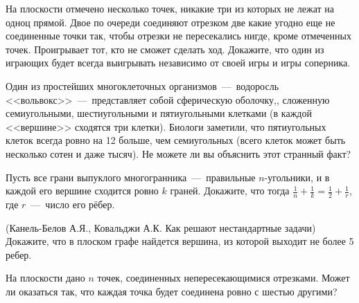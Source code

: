 \begin{exersize}
	На плоскости отмечено несколько точек, никакие три из которых не лежат на одноц прямой. Двое по очереди соединяют отрезком две какие угодно еще не соединенные точки так, чтобы отрезки не пересекались нигде, кроме отмеченных точек. Проигрывает тот, кто не сможет сделать ход. Докажите, что один из играющих будет всегда выигрывать независимо от своей игры и игры соперника.
\end{exersize}

\begin{exersize}
	Один из простейших многоклеточных организмов~---~водоросль <<вольвокс>>~---~представляет собой сферическую оболочку,, сложенную семиугольными, шестиугольными и пятиугольными клетками (в каждой <<вершине>> сходятся три клетки). Биологи заметили, что пятиугольных клеток всегда ровно на 12 больше, чем семиугольных (всего клеток может быть несколько сотен и даже тысяч). Не можете ли вы объяснить этот странный факт?
\end{exersize}

\begin{exersize}
	Пусть все грани выпуклого многогранника~---~правильные $n$-угольники, и в каждой его вершине сходится ровно $k$ граней. Докажите, что тогда $\frac{1}{n} + \frac{1}{k} = \frac{1}{2} + \frac{1}{r}$, где $r$~---~число его рёбер.
\end{exersize}

\begin{exersize}(Канель-Белов А.Я., Ковальджи А.К. Как решают нестандартные задачи)
	Докажите, что в плоском графе найдется вершина, из которой выходит не более 5 ребер.
\end{exersize}

\begin{exersize}
	На плоскости дано $n$ точек, соединенных непересекающимися отрезками. Может ли оказаться так, что каждая точка будет соединена ровно с шестью другими?
	
\end{exersize}
